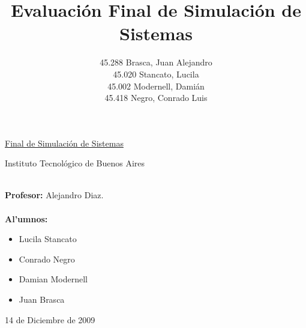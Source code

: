 \documentclass{article}
\title{Evaluaci\'on Final de Simulaci\'on de Sistemas}
\author{45.288 Brasca, Juan Alejandro\\45.020 Stancato, Lucila\\45.002 Modernell, Dami\'an\\45.418 Negro, Conrado Luis}
\numberwithin{equation}{section}
\numberwithin{figure}{section}
\numberwithin{table}{section}
\begin{document}
\Large

%
%
\pagestyle{fancy}
\renewcommand{\sectionmark}[1]{\markboth{}{\thesection\ \ #1}}
\renewcommand{\footrulewidth}{0.6pt} %

\chead{}
\lfoot{}
\cfoot{\thepage}
\rfoot{}

%
%
\begin{titlepage}

%
%
%
\begin{figure}
\begin{center}
\end{center}
\end{figure}

\vspace{3cm}
%
	\begin{center}
		\underline{\Huge{Final de Simulaci\'on de Sistemas}}\\
\vspace{1cm}
	    \huge{Instituto Tecnol\'ogico de Buenos Aires
		\vspace{1cm}
		
}	\end{center}
	\vspace{1.5cm}
%
%


\noindent \huge{{\bf}
\\
\Large{{\bf Profesor:}} Alejandro Diaz. \\
\\
  \Large{{\bf Al'umnos:}}
\begin{itemize}
 \item Lucila Stancato \\
\item Conrado Negro \\
\item Damian Modernell \\
\item Juan Brasca 

\end{itemize}
 

	\vfill
  \begin{center}
		\huge{14 de Diciembre de 2009}
	\end{center}
}
\end{titlepage}
\end{document}
